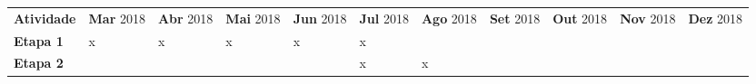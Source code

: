 \begin{table}[h!]
 \centering
 {\renewcommand\arraystretch{1.25}
 \begin{tabular}{ l l l l l l l l l l l }
  \cline{1-1}\cline{2-2}\cline{3-3}\cline{4-4}\cline{5-5}\cline{6-6}\cline{7-7}\cline{8-8}\cline{9-9}\cline{10-10}\cline{11-11}  
    \multicolumn{1}{|p{4cm}|}{\textbf{Atividade} \centering } &
    \multicolumn{1}{p{0.733cm}|}{\textbf{Mar} 2018 \centering } &
    \multicolumn{1}{p{0.733cm}|}{\textbf{Abr} 2018 \centering } &
    \multicolumn{1}{p{0.733cm}|}{\textbf{Mai} 2018 \centering } &
    \multicolumn{1}{p{0.733cm}|}{\textbf{Jun} 2018 \centering } &
    \multicolumn{1}{p{0.733cm}|}{\textbf{Jul} 2018 \centering } &
    \multicolumn{1}{p{0.733cm}|}{\textbf{Ago} 2018 \centering } &
    \multicolumn{1}{p{0.733cm}|}{\textbf{Set} 2018 \centering } &
    \multicolumn{1}{p{0.733cm}|}{\textbf{Out} 2018 \centering } &
    \multicolumn{1}{p{0.733cm}|}{\textbf{Nov} 2018 \centering } &
    \multicolumn{1}{p{0.733cm}|}{\textbf{Dez} 2018 \centering }
  \\  
  \cline{1-1}\cline{2-2}\cline{3-3}\cline{4-4}\cline{5-5}\cline{6-6}\cline{7-7}\cline{8-8}\cline{9-9}\cline{10-10}\cline{11-11}  
    \multicolumn{1}{|p{4cm}|}{\textbf{Etapa 1}} &
    \multicolumn{1}{p{0.733cm}|}{x \centering } &
    \multicolumn{1}{p{0.733cm}|}{x \centering } &
    \multicolumn{1}{p{0.733cm}|}{x \centering } &
    \multicolumn{1}{p{0.733cm}|}{x \centering } &
    \multicolumn{1}{p{0.733cm}|}{x \centering } &
    \multicolumn{1}{p{0.733cm}|}{  \centering } &
    \multicolumn{1}{p{0.733cm}|}{  \centering } &
    \multicolumn{1}{p{0.733cm}|}{  \centering } &
    \multicolumn{1}{p{0.733cm}|}{  \centering } &
    \multicolumn{1}{p{0.733cm}|}{  \centering }
  \\  
  \cline{1-1}\cline{2-2}\cline{3-3}\cline{4-4}\cline{5-5}\cline{6-6}\cline{7-7}\cline{8-8}\cline{9-9}\cline{10-10}\cline{11-11}  
    \multicolumn{1}{|p{4cm}|}{\textbf{Etapa 2}} &
    \multicolumn{1}{p{0.733cm}|}{  \centering } &
    \multicolumn{1}{p{0.733cm}|}{  \centering } &
    \multicolumn{1}{p{0.733cm}|}{  \centering } &
    \multicolumn{1}{p{0.733cm}|}{  \centering } &
    \multicolumn{1}{p{0.733cm}|}{x \centering } &
    \multicolumn{1}{p{0.733cm}|}{x \centering } &
    \multicolumn{1}{p{0.733cm}|}{  \centering } &
    \multicolumn{1}{p{0.733cm}|}{  \centering } &
    \multicolumn{1}{p{0.733cm}|}{  \centering } &
    \multicolumn{1}{p{0.733cm}|}{  \centering }
  \\  
  \cline{1-1}\cline{2-2}\cline{3-3}\cline{4-4}\cline{5-5}\cline{6-6}\cline{7-7}\cline{8-8}\cline{9-9}\cline{10-10}\cline{11-11}  

\end{tabular}}
\end{table}
